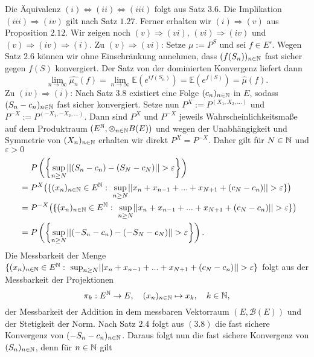\begin{proof*}
    Die Äquivalenz $(i) \iff (ii) \iff (iii)$ folgt aus Satz $3.6$. Die Implikation $(iii) \Rightarrow (iv)$ gilt nach Satz $1.27$. Ferner erhalten wir $(i) \Rightarrow (v)$ aus Proposition $2.12$.
    Wir zeigen noch $(v)\Rightarrow (vi)$, $(vi) \Rightarrow (iv)$ und $(v) \Rightarrow (iv) \Rightarrow (i)$. 
    \newline
    Zu $(v)\Rightarrow (vi)$: Setze $\mu := P^S$ und sei $f \in E'$. Wegen Satz $2.6$ können wir ohne Einschränkung annehmen, dass $(f(S_n))_{n \in \mathbb{N}}$ fast sicher gegen $f(S)$ konvergiert. 
    Der Satz von der dominierten Konvergenz liefert dann 
    $$
        \lim_{n \to \infty}\widehat{\mu_n}(f) = \lim_{n \to \infty}\mathbb{E}(e^{if(S_n)}) = \mathbb{E}(e^{f(S)}) = \widehat{\mu}(f).
    $$
    \newline
    Zu $(iv) \Rightarrow (i)$:
    Nach Satz $3.8$ existiert eine Folge $(c_n)_{n \in \mathbb{N}}$ in $E$, sodass $(S_n - c_n)_{n \in \mathbb{N}}$ fast sicher konvergiert. Setze nun $P^X := P^{(X_1,X_2,...)}$ und $P^{-X} :=P^{(-X_1,-X_2,...)}$. 
    Dann sind $P^X$ und $P^{-X}$ jeweils Wahrscheinlichkeitsmaße auf dem Produktraum $(E^{\mathbb{N}}, \otimes_{n \in \mathbb{N}}B(E))$ und wegen der Unabhängigkeit und Symmetrie von $(X_n)_{n \in \mathbb{N}}$ erhalten wir direkt $P^X = P^{-X}$. Daher gilt für $N \in \mathbb{N}$ und $\varepsilon >0$
    \begin{align}
        &\quad \ \prob{\sup_{n \geq N}\norm{(S_n - c_n) - (S_N - c_N)} > \varepsilon} \nonumber \\\   
                &= P^X\big(\{(x_n)_{n \in \N}\in E^{\N}: \  \sup_{n \geq N}\norm{x_n + x_{n-1} + ... + x_{N+1} + (c_N - c_n)} > \varepsilon \}\big) \nonumber\\\ 
                &= P^{-X}\big(\{(x_n)_{n \in \N}\in E^{\N}: \ \sup_{n \geq N}\norm{x_n + x_{n-1} + ... + x_{N+1} + (c_N - c_n)} > \varepsilon \}\big) \nonumber\\\ 
                &= \prob{\sup_{n \geq N}\norm{(-S_n - c_n) - (-S_N - c_N)} > \varepsilon}.
    \end{align}
    Die Messbarkeit der Menge $\{(x_n)_{n \in \mathbb{N}}\in E^{\mathbb{N}}: \  \sup_{n \geq N}\lvert\lvert x_n + x_{n-1} + ... + x_{N+1} + (c_N - c_n) \rvert\rvert > \varepsilon \}$ folgt aus der Messbarkeit der Projektionen 
    $$
    \pi_k: E^{\mathbb{N}} \to E, \quad (x_n)_{n \in \mathbb{N}} \mapsto x_k, \quad k \in \mathbb{N}, 
    $$ 
    der Messbarkeit der Addition in dem messbaren Vektorraum $(E, \mathcal{B}(E))$ und der Stetigkeit der Norm. 
    Nach Satz $2.4$ folgt  aus $(3.8)$ die fast sichere Konvergenz von $(-S_n - c_n)_{n \in \mathbb{N}}$. Daraus folgt nun die fast sichere Konvergenz von $(S_n)_{n \in \mathbb{N}}$, denn für $n \in \mathbb{N}$ gilt

\end{proof*}
